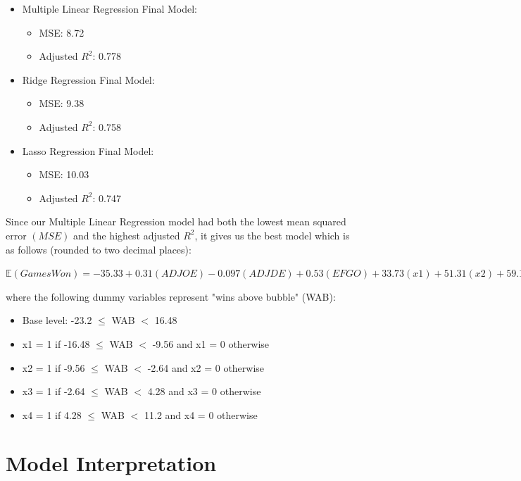 \documentclass{article}
\begin{document}
\begin{itemize}
  \item Multiple Linear Regression Final Model:
      \begin{itemize}
        \item MSE: 8.72
        \item Adjusted $R^2$: 0.778
      \end{itemize}

  \item Ridge Regression Final Model:
      \begin{itemize}
        \item MSE: 9.38
        \item Adjusted $R^2$: 0.758
      \end{itemize}
  \item Lasso Regression Final Model:
      \begin{itemize}
        \item MSE: 10.03
        \item Adjusted $R^2$: 0.747
      \end{itemize}
\end{itemize}

Since our Multiple Linear Regression model had both the lowest mean squared error $(MSE)$ and the highest adjusted $R^2$, it gives us the best model which is as follows (rounded to two decimal places):

$\mathbb{E}(Games Won) = -35.33 + 0.31(ADJOE) - 0.097(ADJDE) + 0.53(EFGO) + 33.73(x1) + 51.31(x2) + 59.16(x3) + 27.88(x4) - 0.32(ADJOE*x1) - 0.44(ADJOE * x2) - 0.47(ADJOE * x3) - 0.16(ADJOE *x4)$ 

    where the following dummy variables represent "wins above bubble" (WAB):
  
    \begin{itemize}
          \item Base level: -23.2 $\leq$ WAB $<$ 16.48
          \item x1 = 1 if -16.48 $\leq$ WAB $<$ -9.56 and x1 = 0 otherwise
          \item x2 = 1 if -9.56 $\leq$ WAB $<$ -2.64 and x2 = 0 otherwise
          \item x3 = 1 if -2.64 $\leq$ WAB $<$ 4.28 and x3 = 0 otherwise
          \item x4 = 1 if 4.28 $\leq$ WAB $<$ 11.2 and x4 = 0 otherwise
    \end{itemize}



\section{Model Interpretation}
\end{document}

